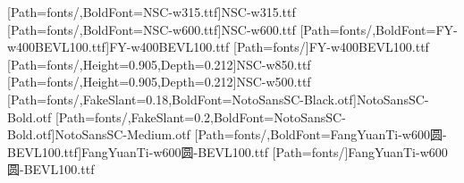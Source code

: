 [Path=fonts/,BoldFont=NSC-w315.ttf]{NSC-w315.ttf}
[Path=fonts/,BoldFont=NSC-w600.ttf]{NSC-w600.ttf}
[Path=fonts/,BoldFont=FY-w400BEVL100.ttf]{FY-w400BEVL100.ttf}
\newfontfamily{\libianlat}[Path=fonts/]{FY-w400BEVL100.ttf}
\newfontfamily{\numbold}[Path=fonts/,Height=0.905,Depth=0.212]{NSC-w850.ttf}
\newfontfamily{\numboldjian}[Path=fonts/,Height=0.905,Depth=0.212]{NSC-w500.ttf}
[Path=fonts/,FakeSlant=0.18,BoldFont=NotoSansSC-Black.otf]{NotoSansSC-Bold.otf}
[Path=fonts/,FakeSlant=0.2,BoldFont=NotoSansSC-Bold.otf]{NotoSansSC-Medium.otf}
[Path=fonts/,BoldFont=FangYuanTi-w600圆-BEVL100.ttf]{FangYuanTi-w600圆-BEVL100.ttf}
\newfontfamily{\lilat}[Path=fonts/]{FangYuanTi-w600圆-BEVL100.ttf}
\newcommand{\heiti}{\CJKfamily{hei}}
\newcommand{\heizhang}{\CJKfamily{heizhang}}
\newcommand{\heijie}{\CJKfamily{heijie}}
\newcommand{\hejie}{\CJKfamily{hejie}}
\newcommand{\hekeshi}{\CJKfamily{hekeshi}}
\newcommand{\libian}{\CJKfamily{libian}}
\newcommand{\heitiao}{\CJKfamily{heitiao}}
\newcommand{\heibf}{\CJKfamily{heibf}}
\newcommand{\heihao}{\CJKfamily{heihao}}
\newcommand{\heibian}{\CJKfamily{heibian}}
\newcommand{\huabf}{\CJKfamily{huabf}}
\newcommand{\lihei}{\CJKfamily{lihei}}
\newcommand{\kaishu}{\CJKfamily{kai}}
\newcommand{\fangsong}{\CJKfamily{fangsong}}%
